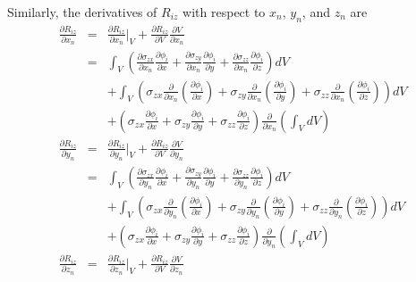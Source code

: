 Similarly, the derivatives of $R_{iz}$ with respect to $x_n$, $y_n$, and $z_n$ are
%
\begin{eqnarray}
\frac{\partial R_{iz}}{\partial x_n} &=& \frac{\partial R_{iz}}{\partial x_n} \bigg |_V + \frac{\partial R_{iz}}{\partial V} \frac{\partial V}{\partial x_n} \nonumber\\
&=& \int_V \left(\frac{\partial \sigma_{zx}}{\partial x_n}\frac{\partial \phi_i}{\partial x} + \frac{\partial \sigma_{zy}}{\partial x_n}\frac{\partial \phi_i}{\partial y} + \frac{\partial \sigma_{zz}}{\partial x_n}\frac{\partial \phi_i}{\partial z}  \right) dV \nonumber\\
&&+ \int_V \left( \sigma_{zx} \frac{\partial}{\partial x_n} \left(\frac{\partial \phi_i}{\partial x}\right)+\sigma_{zy} \frac{\partial}{\partial x_n} \left(\frac{\partial \phi_i}{\partial y}\right) + \sigma_{zz} \frac{\partial}{\partial x_n} \left(\frac{\partial \phi_i}{\partial z}\right) \right) dV \nonumber\\
&& + \left(  \sigma_{zx} \frac{\partial \phi_i}{\partial x} + \sigma_{zy} \frac{\partial \phi_i}{\partial y} + \sigma_{zz} \frac{\partial \phi_i}{\partial z} \right) \frac{\partial}{\partial x_n} \left(\int_V dV \right) \nonumber\\
\frac{\partial R_{iz}}{\partial y_n} &=& \frac{\partial R_{iz}}{\partial y_n} \bigg |_V + \frac{\partial R_{iz}}{\partial V} \frac{\partial V}{\partial y_n} \nonumber\\
&=& \int_V \left(\frac{\partial \sigma_{zx}}{\partial y_n}\frac{\partial \phi_i}{\partial x} +\frac{\partial \sigma_{zy}}{\partial y_n}\frac{\partial \phi_i}{\partial y} +  \frac{\partial \sigma_{zz}}{\partial y_n}\frac{\partial \phi_i}{\partial z}  \right) dV \nonumber\\
&& + \int_V \left( \sigma_{zx} \frac{\partial}{\partial y_n} \left(\frac{\partial \phi_i}{\partial x}\right)+ \sigma_{zy} \frac{\partial}{\partial y_n} \left(\frac{\partial \phi_i}{\partial y}\right) + \sigma_{zz} \frac{\partial}{\partial y_n} \left(\frac{\partial \phi_i}{\partial z}\right) \right) dV \nonumber\\
&& + \left(  \sigma_{zx} \frac{\partial \phi_i}{\partial x} + \sigma_{zy} \frac{\partial \phi_i}{\partial y} + \sigma_{zz} \frac{\partial \phi_i}{\partial z} \right) \frac{\partial}{\partial y_n} \left(\int_V dV \right) \nonumber\\
\frac{\partial R_{iz}}{\partial z_n} &=& \frac{\partial R_{iz}}{\partial z_n} \bigg |_V + \frac{\partial R_{iz}}{\partial V} \frac{\partial V}{\partial z_n} \nonumber\\

\end{eqnarray}
